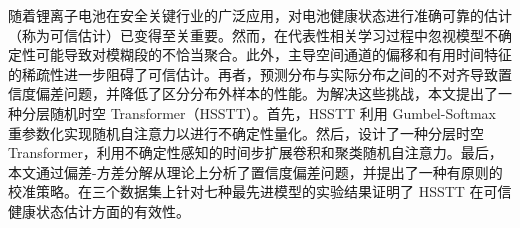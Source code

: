 随着锂离子电池在安全关键行业的广泛应用，对电池健康状态进行准确可靠的估计（称为可信估计）已变得至关重要。然而，在代表性相关学习过程中忽视模型不确定性可能导致对模糊段的不恰当聚合。此外，主导空间通道的偏移和有用时间特征的稀疏性进一步阻碍了可信估计。再者，预测分布与实际分布之间的不对齐导致置信度偏差问题，并降低了区分分布外样本的性能。为解决这些挑战，本文提出了一种分层随机时空 Transformer（HSSTT）。首先，HSSTT 利用 Gumbel-Softmax 重参数化实现随机自注意力以进行不确定性量化。然后，设计了一种分层时空 Transformer，利用不确定性感知的时间步扩展卷积和聚类随机自注意力。最后，本文通过偏差-方差分解从理论上分析了置信度偏差问题，并提出了一种有原则的校准策略。在三个数据集上针对七种最先进模型的实验结果证明了 HSSTT 在可信健康状态估计方面的有效性。
